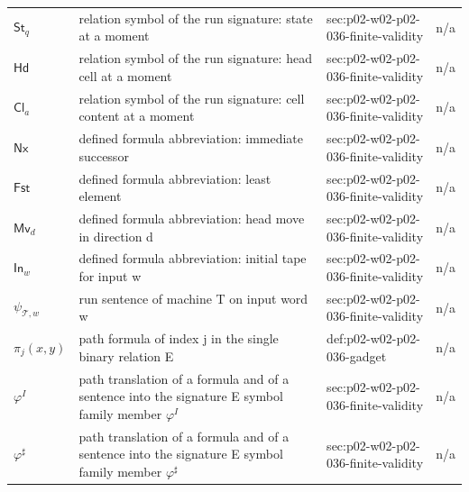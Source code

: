 \begin{longtable}{@{}p{}p{}p{}p{}@{}}
\(\mathsf{St}_q\) & relation symbol of the run signature: state at a moment & sec:\allowbreak{}p02-\allowbreak{}w02-\allowbreak{}p02-\allowbreak{}036-\allowbreak{}finite-\allowbreak{}validity & n/a \\
\(\mathsf{Hd}\) & relation symbol of the run signature: head cell at a moment & sec:\allowbreak{}p02-\allowbreak{}w02-\allowbreak{}p02-\allowbreak{}036-\allowbreak{}finite-\allowbreak{}validity & n/a \\
\(\mathsf{Cl}_a\) & relation symbol of the run signature: cell content at a moment & sec:\allowbreak{}p02-\allowbreak{}w02-\allowbreak{}p02-\allowbreak{}036-\allowbreak{}finite-\allowbreak{}validity & n/a \\
\(\mathsf{Nx}\) & defined formula abbreviation: immediate successor & sec:\allowbreak{}p02-\allowbreak{}w02-\allowbreak{}p02-\allowbreak{}036-\allowbreak{}finite-\allowbreak{}validity & n/a \\
\(\mathsf{Fst}\) & defined formula abbreviation: least element & sec:\allowbreak{}p02-\allowbreak{}w02-\allowbreak{}p02-\allowbreak{}036-\allowbreak{}finite-\allowbreak{}validity & n/a \\
\(\mathsf{Mv}_d\) & defined formula abbreviation: head move in direction d & sec:\allowbreak{}p02-\allowbreak{}w02-\allowbreak{}p02-\allowbreak{}036-\allowbreak{}finite-\allowbreak{}validity & n/a \\
\(\mathsf{In}_w\) & defined formula abbreviation: initial tape for input w & sec:\allowbreak{}p02-\allowbreak{}w02-\allowbreak{}p02-\allowbreak{}036-\allowbreak{}finite-\allowbreak{}validity & n/a \\
\(\psi_{\mathcal T,w}\) & run sentence of machine T on input word w & sec:\allowbreak{}p02-\allowbreak{}w02-\allowbreak{}p02-\allowbreak{}036-\allowbreak{}finite-\allowbreak{}validity & n/a \\
\(\pi_j(x,\allowbreak y)\) & path formula of index j in the single binary relation E & def:\allowbreak{}p02-\allowbreak{}w02-\allowbreak{}p02-\allowbreak{}036-\allowbreak{}gadget & n/a \\
\(\varphi^{I}\) & path translation of a formula and of a sentence into the signature {E} symbol family member \(\varphi^{I}\) & sec:\allowbreak{}p02-\allowbreak{}w02-\allowbreak{}p02-\allowbreak{}036-\allowbreak{}finite-\allowbreak{}validity & n/a \\
\(\varphi^{\sharp}\) & path translation of a formula and of a sentence into the signature {E} symbol family member \(\varphi^{\sharp}\) & sec:\allowbreak{}p02-\allowbreak{}w02-\allowbreak{}p02-\allowbreak{}036-\allowbreak{}finite-\allowbreak{}validity & n/a \\

\end{longtable}
